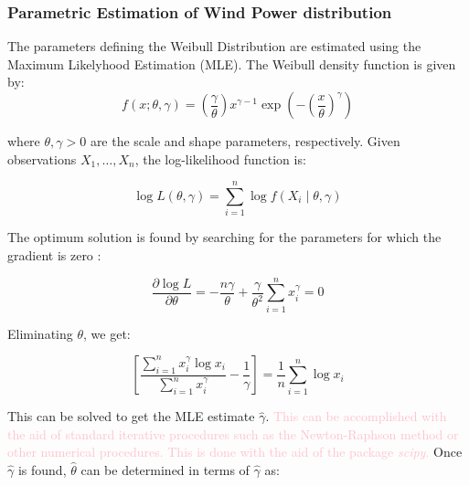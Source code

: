 {%

\subsubsection{Parametric Estimation of Wind Power distribution}\label{subsection: weib estim}

The parameters defining the Weibull Distribution are estimated using the Maximum Likelyhood Estimation (MLE). The Weibull density function is given by:
\[
f(x; \theta, \gamma) = \left(\frac{\gamma}{\theta}\right)x^{\gamma-1}\exp\left(-\left(\frac{x}{\theta}\right)^\gamma\right)
\]

where \(\theta, \gamma > 0\) are the scale and shape parameters, respectively. Given observations \(X_1, \ldots, X_n\), the log-likelihood function is:

\[
\log L(\theta, \gamma) = \sum_{i=1}^n \log f(X_i \mid \theta, \gamma)
\]

The optimum solution is found by searching for the parameters for which the gradient is zero :

\begin{equation}
\frac{\partial \log L}{\partial \theta} = -\frac{n \gamma}{\theta} + \frac{\gamma}{\theta^2} \sum_{i=1}^{n} x_i^\gamma = 0
\end{equation}

Eliminating $\theta$, we get:

\begin{equation}
\left[ \frac{\sum_{i=1}^{n} x_i^\gamma \log x_i}{\sum_{i=1}^{n} x_i^\gamma} - \frac{1}{\gamma} \right] = \frac{1}{n} \sum_{i=1}^{n} \log x_i
\end{equation}

This can be solved to get the MLE estimate $\hat{\gamma}$. \textcolor{pink}{This can be accomplished with the aid of standard iterative procedures such as the Newton-Raphson method or other numerical procedures. This is done with the aid of the package \emph{scipy}.} Once $\hat{\gamma}$ is found, $\hat{\theta}$ can be determined in terms of $\hat{\gamma}$ as:

}
